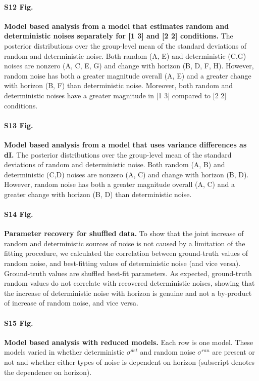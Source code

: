 \documentclass[12pt]{article}
\begin{document}
{\paragraph*{S12 Fig.}
\label{S12_Fig}
{\bf Model based analysis from a model that estimates random and deterministic noises separately for [1 3] and [2 2] conditions.} The posterior distributions over the group-level mean of the standard deviations of  random and deterministic noise. Both random (A, E) and deterministic (C,G) noises are nonzero (A, C, E, G) and change with horizon (B, D, F, H).  However, random noise has both a greater magnitude overall (A, E) and a greater change with horizon (B, F) than deterministic noise. Moreover, both random and deterministic noises have a greater magnitude in [1 3] compared to [2 2] conditions.

\paragraph*{S13 Fig.}
\label{S13_Fig}
{\bf Model based analysis from a model that uses variance differences as dI.} The posterior distributions over the group-level mean of the standard deviations of  random and deterministic noise. Both random (A, B) and deterministic (C,D) noises are nonzero (A, C) and change with horizon (B, D).  However, random noise has both a greater magnitude overall (A, C) and a greater change with horizon (B, D) than deterministic noise.

\paragraph*{S14 Fig.}
\label{S14_Fig}
{\bf Parameter recovery for shuffled data.} To show that the joint increase of random and deterministic sources of noise is not caused by a limitation of the fitting procedure, we calculated the correlation between ground-truth values of random noise, and best-fitting values of deterministic noise (and vice versa). Ground-truth values are shuffled best-fit parameters. As expected, ground-truth random values do not correlate with recovered deterministic noises, showing that the increase of deterministic noise with horizon is genuine and not a by-product of increase of random noise, and vice versa. 

\paragraph*{S15 Fig.}
\label{S15_Fig}
{\bf Model based analysis with reduced models.} Each row is one model. These models varied in whether deterministic $\sigma^{det}$ and random noise $\sigma^{ran}$ are present or not and whether either types of noise is dependent on horizon (subscript denotes the dependence on horizon). 

}
\end{document}
